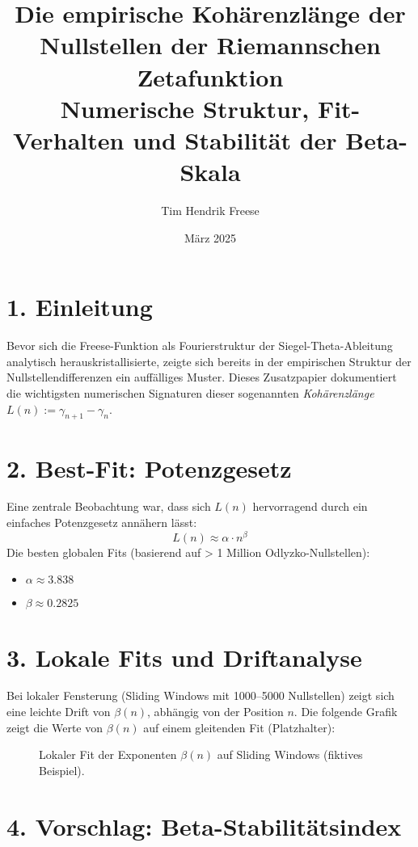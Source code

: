 \documentclass[12pt]{article}
\title{Die empirische Kohärenzlänge der Nullstellen der Riemannschen Zetafunktion\\
\large Numerische Struktur, Fit-Verhalten und Stabilität der Beta-Skala}
\author{Tim Hendrik Freese}
\date{März 2025}
\begin{document}
\maketitle

\section*{1. Einleitung}

Bevor sich die Freese-Funktion als Fourierstruktur der Siegel-Theta-Ableitung analytisch herauskristallisierte, zeigte sich bereits in der empirischen Struktur der Nullstellendifferenzen ein auffälliges Muster.  
Dieses Zusatzpapier dokumentiert die wichtigsten numerischen Signaturen dieser sogenannten \emph{Kohärenzlänge} \( L(n) := \gamma_{n+1} - \gamma_n \).

\section*{2. Best-Fit: Potenzgesetz}

Eine zentrale Beobachtung war, dass sich \( L(n) \) hervorragend durch ein einfaches Potenzgesetz annähern lässt:
\[
L(n) \approx \alpha \cdot n^{\beta}
\]
Die besten globalen Fits (basierend auf > 1 Million Odlyzko-Nullstellen):

\begin{itemize}
  \item \( \alpha \approx 3.838 \)
  \item \( \beta \approx 0.2825 \)
\end{itemize}

\section*{3. Lokale Fits und Driftanalyse}

Bei lokaler Fensterung (Sliding Windows mit 1000–5000 Nullstellen) zeigt sich eine leichte Drift von \( \beta(n) \), abhängig von der Position \( n \).  
Die folgende Grafik zeigt die Werte von \( \beta(n) \) auf einem gleitenden Fit (Platzhalter):

\begin{figure}[H]
\centering
\caption{Lokaler Fit der Exponenten \( \beta(n) \) auf Sliding Windows (fiktives Beispiel).}
\end{figure}

\section*{4. Vorschlag: Beta-Stabilitätsindex}
\end{document}
